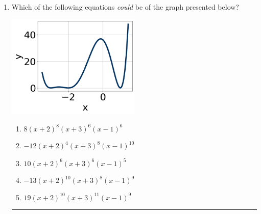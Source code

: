 \documentclass[14pt]{extbook}
\newcommand{\litem}[1]{\item#1\hspace*{-1cm}\rule{\textwidth}{0.4pt}}
\begin{document}
\begin{enumerate}
{\begin{enumerate}[label=\Alph*.]
\end{enumerate} }
\litem{
Which of the following equations \textit{could} be of the graph presented below?
\begin{center}
    \includegraphics[width=0.5\textwidth]{../Figures/polyGraphToFunctionA.png}
\end{center}
\begin{enumerate}[label=\Alph*.]
\item \( 8(x + 2)^{8} (x + 3)^{6} (x - 1)^{6} \)
\item \( -12(x + 2)^{4} (x + 3)^{8} (x - 1)^{10} \)
\item \( 10(x + 2)^{6} (x + 3)^{6} (x - 1)^{5} \)
\item \( -13(x + 2)^{10} (x + 3)^{8} (x - 1)^{9} \)
\item \( 19(x + 2)^{10} (x + 3)^{11} (x - 1)^{9} \)


\end{enumerate}}
\end{enumerate}
\end{document}
